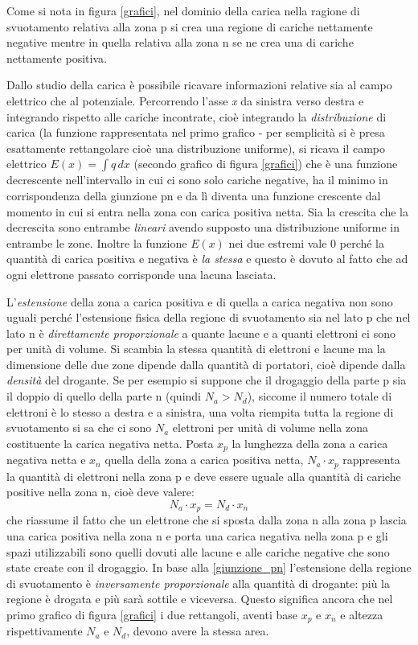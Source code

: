 \documentclass[12pt, a4paper]{report}
\begin{document}
Come si nota in figura \ref{grafici}, nel dominio della carica nella ragione di svuotamento relativa alla zona p si crea una regione di cariche nettamente negative mentre in quella relativa alla zona n se ne crea una di cariche nettamente positiva.

Dallo studio della carica è possibile ricavare informazioni relative sia al campo elettrico che al potenziale. Percorrendo l'asse \textit{x} da sinistra verso destra e integrando rispetto alle cariche incontrate, cioè integrando la \textit{distribuzione} di carica (la funzione rappresentata nel primo grafico - per semplicità si è presa esattamente rettangolare cioè una distribuzione uniforme), si ricava il campo elettrico $E(x) = \int q\,dx$ (secondo grafico di figura \ref{grafici}) che è una funzione decrescente nell'intervallo in cui ci sono solo cariche negative, ha il minimo in corrispondenza della giunzione pn e da lì diventa una funzione crescente dal momento in cui si entra nella zona con carica positiva netta. Sia la crescita che la decrescita sono entrambe \textit{lineari} avendo supposto una distribuzione uniforme in entrambe le zone. Inoltre la funzione $E(x)$ nei due estremi vale $0$ perché la quantità di carica positiva e negativa è \textit{la stessa} e questo è dovuto al fatto che ad ogni elettrone passato corrisponde una lacuna lasciata.

L'\textit{estensione} della zona a carica positiva e di quella a carica negativa non sono uguali perché l'estensione fisica della regione di svuotamento sia nel lato p che nel lato n è \textit{direttamente proporzionale} a quante lacune e a quanti elettroni ci sono per unità di volume. Si scambia la stessa quantità di elettroni e lacune ma la dimensione delle due zone dipende dalla quantità di portatori, cioè dipende dalla \textit{densità} del drogante. Se per esempio si suppone che il drogaggio della parte p sia il doppio di quello della parte n (quindi $N_{a} > N_{d}$), siccome il numero totale di elettroni è lo stesso a destra e a sinistra, una volta riempita tutta la regione di svuotamento si sa che ci sono $N_{a}$ elettroni per unità di volume nella zona costituente la carica negativa netta. Posta $x_p$ la lunghezza della zona a carica negativa netta e $x_{n}$ quella della zona a carica positiva netta, $N_{a} \cdot x_{p}$ rappresenta la quantità di elettroni nella zona p e deve essere uguale alla quantità di cariche positive nella zona n, cioè deve valere:
\begin{equation}
    N_{a} \cdot x_p = N_{d} \cdot x_n
    \label{giunzione_pn}
\end{equation}
che riassume il fatto che un elettrone che si sposta dalla zona n alla zona p lascia una carica positiva nella zona n e porta una carica negativa nella zona p e gli spazi utilizzabili sono quelli dovuti alle lacune e alle cariche negative che sono state create con il drogaggio. In base alla \eqref{giunzione_pn} l'estensione della regione di svuotamento è \textit{inversamente proporzionale} alla quantità di drogante: più la regione è drogata e più sarà sottile e viceversa. Questo significa ancora che nel primo grafico di figura \ref{grafici} i due rettangoli, aventi base $x_{p}$ e $x_{n}$ e altezza rispettivamente $N_{a}$ e $N_{d}$, devono avere la stessa area.
\end{document}
